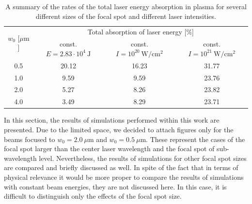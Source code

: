 \begingroup
\renewcommand*{\arraystretch}{1.5}
\begin{table}[b]
	\centering
	\begin{tabular}{c | c | c | c}
		\multirow{2}{*}{$ w_0 $ [$ \mu\mathrm{m} $]} & \multicolumn{3}{c}{Total absorption of laser energy [\%]} \\ \cline{2-4}
		 & const. $ E = 2.83 \cdot 10^{4} \ \mathrm{J} $ & const. $ I = 10^{20} \ \mathrm{W/cm^2} $ & const. $ I = 10^{21} \ \mathrm{W/cm^2} $ \\ \hline \hline
		0.5 & 20.12 & 16.23 & 31.77 \\ \hline
		1.0 & 9.59 & 9.59 & 23.76 \\ \hline
		2.0 & 5.27 & 8.26 & 23.82 \\ \hline
		4.0 & 3.49 & 8.29 & 23.71 \\
	\end{tabular}
	\caption{A summary of the rates of the total laser energy absorption in plasma for several different sizes of the focal spot and different laser intensities.}
	\label{table:2}
\end{table}
\endgroup

In this section, the results of simulations performed within this work are presented. Due to the limited space, we decided to attach figures only for the beams focused to $ w_0 = 2.0 \ \mu\mathrm{m} $ and $ w_0 = 0.5 \ \mu\mathrm{m} $. These represent the cases of the focal spot larger than the center laser wavelength and the focal spot of sub-wavelength level. Nevertheless, the results of simulations for other focal spot sizes are compared and briefly discussed as well. In spite of the fact that in terms of physical relevance it would be more proper to compare the results of simulations with constant beam energies, they are not discussed here. In this case, it is difficult to distinguish only the effects of the focal spot size.

